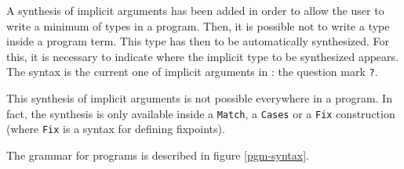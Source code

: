 
A synthesis of implicit arguments has been added in order to
allow the user to write a minimum of types in a program. Then, it is
possible not to write a type inside a program term. This type has then
to be automatically synthesized. For this, it is necessary to indicate
where the implicit type to be synthesized appears. The syntax is the
current one of implicit arguments in \Coq: the question mark
\verb+?+. 

This synthesis of implicit arguments is not possible everywhere in a
program. In fact, the synthesis is only available inside a
\verb+Match+, a \verb+Cases+ or a \verb+Fix+ construction (where
\verb+Fix+ is a syntax for defining fixpoints).

The grammar for programs is described in figure \ref{pgm-syntax}.

